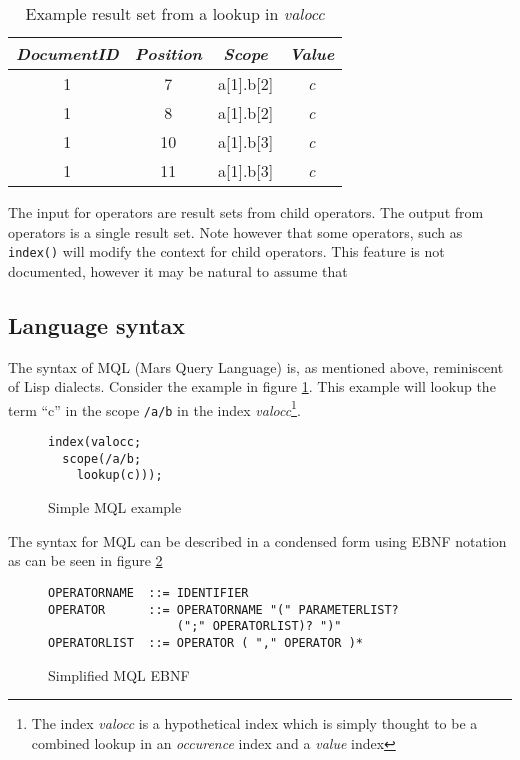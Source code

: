 \begin{table}[!htp]
\begin{center}

\begin{tabular}{| c | c | c | c |}
\hline
\textit{DocumentID} & \textit{Position} & \textit{Scope} & \textit{Value} \\
\hline
1 & 7 & a[1].b[2] & \emph{c} \\ 
\hline
1 & 8 & a[1].b[2] & \emph{c} \\
\hline
1 & 10 & a[1].b[3] & \emph{c} \\ 
\hline
1 & 11 & a[1].b[3] & \emph{c} \\
\hline
\end{tabular}
\caption{Example result set from a lookup in \textit{valocc}}
\label{table:method:mql:example_resultset}
\end{center}
\end{table}

The input for operators are result sets from child operators. The output from
operators is a single result set. Note however that some operators, such as
\texttt{index()} will modify the context for child operators. This feature is
not documented, however it may be natural to assume that

\subsection{Language syntax}
The syntax of MQL (Mars Query Language) is, as mentioned above, reminiscent of
Lisp dialects. Consider the example in figure \ref{figure:mql:op_example}. This
example will lookup the term ``c'' in the scope \texttt{/a/b} in the index
\textit{valocc}\footnote{The index \textit{valocc} is a hypothetical index
which is simply thought to be a combined lookup in an \textit{occurence}
index and a \textit{value} index}.

\begin{figure}[!h]
\centering
\begin{Verbatim}
index(valocc; 
  scope(/a/b;
    lookup(c)));
\end{Verbatim}
\caption{Simple MQL example}
\label{figure:mql:op_example}
\end{figure}

The syntax for MQL can be described in a condensed form using EBNF notation as
can be seen in figure \ref{figure:mql:ebnf}
\begin{figure}[!h]
\centering
\begin{Verbatim}
OPERATORNAME  ::= IDENTIFIER
OPERATOR      ::= OPERATORNAME "(" PARAMETERLIST? 
                  (";" OPERATORLIST)? ")"
OPERATORLIST  ::= OPERATOR ( "," OPERATOR )*
\end{Verbatim}
\caption{Simplified MQL EBNF}
\label{figure:mql:ebnf}
\end{figure}

